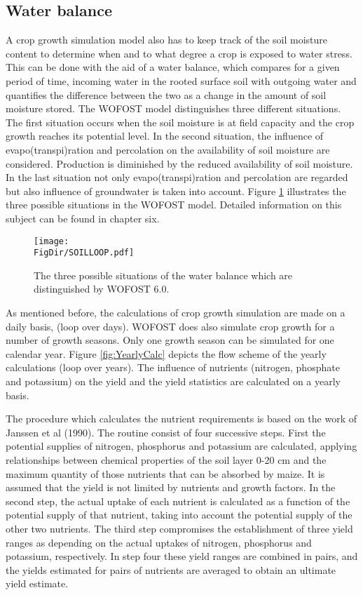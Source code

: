 \subsection{Water balance}
A crop growth simulation model also has to keep track of the soil moisture content to
determine when and to what degree a crop is exposed to water stress. This can be done
with the aid of a water balance, which compares for a given period of time, incoming
water in the rooted surface soil with outgoing water and quantifies the difference between
the two as a change in the amount of soil moisture stored. The WOFOST model distinguishes 
three different situations. The first situation occurs when the soil moisture is at
field capacity and the crop growth reaches its potential level. In the second situation, the
influence of evapo(transpi)ration and percolation on the availability of soil moisture are
considered. Production is diminished by the reduced availability of soil moisture. In the
last situation not only evapo(transpi)ration and percolation are regarded but also influence
of groundwater is taken into account. Figure \ref{fig:waterbalances} illustrates the 
three possible situations in
the WOFOST model. Detailed information on this subject can be found in chapter six.

\begin{figure}[htbp]
\centering
\texttt{[image: \\FigDir/SOILLOOP.pdf]}
\caption{The three possible situations of the water balance which are distinguished
by WOFOST 6.0.}
\label{fig:waterbalances}
\end{figure}

As mentioned before, the calculations of crop growth simulation are made on a daily
basis, (loop over days). WOFOST does also simulate crop growth for a number of growth
seasons. Only one growth season can be simulated for one calendar year. Figure \ref{fig:YearlyCalc}
depicts the flow scheme of the yearly calculations (loop over years). The influence of
nutrients (nitrogen, phosphate and potassium) on the yield and the yield statistics are
calculated on a yearly basis.

The procedure which calculates the nutrient requirements is based on the work of Janssen
et al (1990). The routine consist of four successive steps. First the potential supplies of
nitrogen, phosphorus and potassium are calculated, applying relationships between
chemical properties of the soil layer 0-20 cm and the maximum quantity of those nutrients
that can be absorbed by maize. It is assumed that the yield is not limited by nutrients and
growth factors. In the second step, the actual uptake of each nutrient is calculated as a
function of the potential supply of that nutrient, taking into account the potential supply of
the other two nutrients. The third step compromises the establishment of three yield
ranges as depending on the actual uptakes of nitrogen, phosphorus and potassium,
respectively. In step four these yield ranges are combined in pairs, and the yields
estimated for pairs of nutrients are averaged to obtain an ultimate yield estimate.

